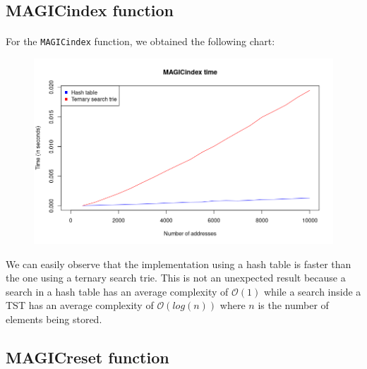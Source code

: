 \documentclass[a4paper, 11pt, oneside]{article}
\begin{document}
\subsection{MAGICindex function}
\paragraph{}For the \texttt{MAGICindex} function, we obtained the following chart:
\begin{figure}[H]
  \centering
  \includegraphics[scale=.5]{plots/index.png}
\end{figure}
We can easily observe that the implementation using a hash table is faster than the one using a ternary search trie. This is not an unexpected result because a search in a hash table has an average complexity of $\mathcal{O}(1)$ while a search inside a TST has an average complexity of $\mathcal{O}(log(n))$ where $n$ is the number of elements being stored.

\subsection{MAGICreset function}
\end{document}
